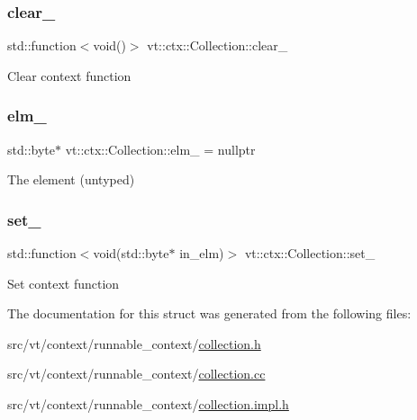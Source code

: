 \subsubsection{\texorpdfstring{clear\+\_\+}{clear\_}}
{\footnotesize\ttfamily std\+::function$<$void()$>$ vt\+::ctx\+::\+Collection\+::clear\+\_\+\hspace{0.3cm}{\ttfamily [private]}}

Clear context function \mbox{\label{structvt_1_1ctx_1_1_collection_a4df2b52dcc2ef62a10ac9211e5a479d9}} 
\subsubsection{\texorpdfstring{elm\+\_\+}{elm\_}}
{\footnotesize\ttfamily std\+::byte$\ast$ vt\+::ctx\+::\+Collection\+::elm\+\_\+ = nullptr\hspace{0.3cm}{\ttfamily [private]}}

The element (untyped) \mbox{\label{structvt_1_1ctx_1_1_collection_a242e2e37cd83472753ec93d01276ddef}} 
\subsubsection{\texorpdfstring{set\+\_\+}{set\_}}
{\footnotesize\ttfamily std\+::function$<$void(std\+::byte$\ast$ in\+\_\+elm)$>$ vt\+::ctx\+::\+Collection\+::set\+\_\+\hspace{0.3cm}{\ttfamily [private]}}

Set context function 

The documentation for this struct was generated from the following files\+:\begin{DoxyCompactItemize}
\item 
src/vt/context/runnable\+\_\+context/\hyperlink{collection_8h}{collection.\+h}\item 
src/vt/context/runnable\+\_\+context/\hyperlink{collection_8cc}{collection.\+cc}\item 
src/vt/context/runnable\+\_\+context/\hyperlink{collection_8impl_8h}{collection.\+impl.\+h}\end{DoxyCompactItemize}
